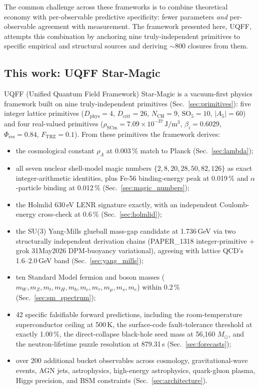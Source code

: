 The common challenge across these frameworks is to combine
theoretical economy with per-observable predictive specificity:
fewer parameters \emph{and} per-observable agreement with
measurement. The framework presented here, UQFF, attempts this
combination by anchoring nine truly-independent primitives to
specific empirical and structural sources and deriving
$\sim 800$ closures from them.

\subsection{This work: UQFF Star-Magic}
\label{sec:this_work}

UQFF (Unified Quantum Field Framework) Star-Magic is a
vacuum-first physics framework built on nine truly-independent
primitives (Sec.~\ref{sec:primitives}): five integer lattice
primitives ($D_{\text{phys}} = 4$, $D_{\text{crit}} = 26$,
$N_{\text{CH}} = 9$, $\mathrm{SO}_5 = 10$, $|A_5| = 60$) and
four real-valued primitives
($\rho_{\text{SCm}} = 7.09\times 10^{-37}\,\mathrm{J/m^3}$,
$\beta_i = 0.6029$, $\Phi_{\text{res}} = 0.84$,
$F_{\text{TRZ}} = 0.1$). From these primitives the framework
derives:

\begin{itemize}
  \item the cosmological constant $\rho_\Lambda$ at 0.003\,\%
        match to Planck (Sec.~\ref{sec:lambda});
  \item all seven nuclear shell-model magic numbers
        $\{2,8,20,28,50,82,126\}$ as exact integer-arithmetic
        identities, plus Fe-56 binding-energy peak at 0.019\,\%
        and $\alpha$-particle binding at 0.012\,\%
        (Sec.~\ref{sec:magic_numbers});
  \item the Holmlid 630\,eV LENR signature exactly, with an
        independent Coulomb-energy cross-check at 0.6\,\%
        (Sec.~\ref{sec:holmlid});
  \item the SU(3) Yang-Mills glueball mass-gap candidate at
        1.736\,GeV via two structurally independent derivation
        chains (PAPER\_1318 integer-primitive + grok 31May2026
        DPM-buoyancy variational), agreeing with lattice QCD's
        1.6--2.0\,GeV band (Sec.~\ref{sec:yang_mills});
  \item ten Standard Model fermion and boson masses
        ($m_W, m_Z, m_t, m_H, m_b, m_c, m_\tau, m_\mu, m_s, m_e$)
        within 0.2\,\% (Sec.~\ref{sec:sm_spectrum});
  \item 42 specific falsifiable forward predictions, including
        the room-temperature superconductor ceiling at 500\,K,
        the surface-code fault-tolerance threshold at exactly
        1.00\,\%, the direct-collapse black-hole seed mass at
        56{,}160 $M_\odot$, and the neutron-lifetime puzzle
        resolution at 879.31\,s (Sec.~\ref{sec:forecasts});
  \item over 200 additional bucket observables across cosmology,
        gravitational-wave events, AGN jets, astrophysics,
        high-energy astrophysics, quark-gluon plasma, Higgs
        precision, and BSM constraints (Sec.~\ref{sec:architecture}).
\end{itemize}

